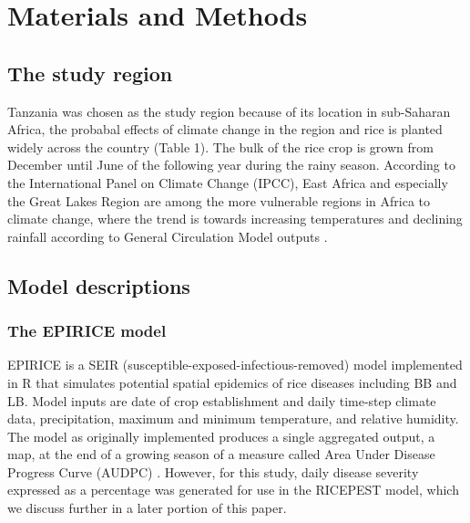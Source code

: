 \documentclass[preprint,12pt]{elsarticle}
\begin{document}
\section{Materials and Methods}


\subsection{The study region}
Tanzania was chosen as the study region because of its location in sub-Saharan Africa, the probabal effects of climate change in the region and rice is planted widely across the country \cite{Rowhani2011} (Table 1). The bulk of the rice crop is grown from December until June of the following year during the rainy season. According to the International Panel on Climate Change (IPCC), East Africa and especially the Great Lakes Region are among the more vulnerable regions in Africa to climate change, where the trend is towards increasing temperatures and declining rainfall according to General Circulation Model outputs \cite{Boko2007}.

\subsection{Model descriptions}
\subsubsection{The EPIRICE model}
EPIRICE \cite{Savary2012} is a SEIR (susceptible-exposed-infectious-removed) model implemented in R  \cite{R2014} that simulates potential spatial epidemics of rice diseases including BB and LB. Model inputs are date of crop establishment and daily time-step climate data, precipitation, maximum and minimum temperature, and relative humidity. The model as originally implemented produces a single aggregated output, a map, at the end of a growing season of a measure called Area Under Disease Progress Curve (AUDPC) \cite{Shaner1977}. However, for this study, daily disease severity expressed as a percentage was generated for use in the RICEPEST model, which we discuss further in a later portion of this paper.
\end{document}
